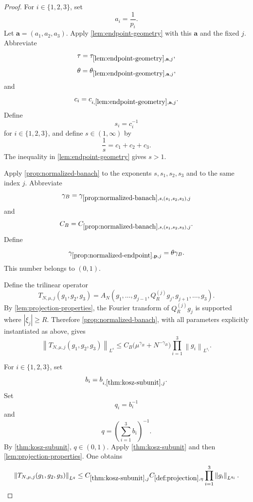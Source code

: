 \documentclass[11pt]{article}
\newcommand{\norm}[2]{\left\lVert #1\right\rVert_{#2}}
\newcommand{\Cst}[2]{C_{\ref{#1},#2}}
\newcommand{\Gam}[2]{\gamma_{\ref{#1},#2}}
\newcommand{\abs}[1]{\left|#1\right|}
\newcommand{\indices}{\{1,2,3\}}
\begin{document}
	\begin{proof}
		For \(i\in\indices\), set
		\[
		a_i=\frac1{p_i}.
		\]
		Let \(\mathbf a=(a_1,a_2,a_3)\).  Apply \cref{lem:endpoint-geometry} with this \(\mathbf a\) and the fixed \(j\).  Abbreviate
		\[
		\tau=\tau_{\ref{lem:endpoint-geometry},\mathbf a,j},
		\]
		\[
		\theta=\theta_{\ref{lem:endpoint-geometry},\mathbf a,j},
		\]
		and
		\[
		c_i=c_{i,\ref{lem:endpoint-geometry},\mathbf a,j}.
		\]
		Define
		\[
		s_i=c_i^{-1}
		\]
		for \(i\in\indices\), and define \(s\in(1,\infty)\) by
		\[
		\frac1s=c_1+c_2+c_3.
		\]
		The inequality in \cref{lem:endpoint-geometry} gives \(s>1\).
		
		Apply \cref{prop:normalized-banach} to the exponents \(s,s_1,s_2,s_3\) and to the same index \(j\).  Abbreviate
		\[
		\gamma_B=\Gam{prop:normalized-banach}{s,(s_1,s_2,s_3),j}
		\]
		and
		\[
		C_B=\Cst{prop:normalized-banach}{s,(s_1,s_2,s_3),j}.
		\]
		Define
		\[
		\Gam{prop:normalized-endpoint}{\mathbf p,j}=\theta\gamma_B.
		\]
		This number belongs to \((0,1)\).
		
		Define the trilinear operator
		\[
		T_{N,\mu,j}(g_1,g_2,g_3)
		=
		A_N(g_1,\ldots,g_{j-1},Q_R^{(j)}g_j,g_{j+1},\ldots,g_3).
		\]
		By \cref{lem:projection-properties}, the Fourier transform of \(Q_R^{(j)}g_j\) is supported where \(\abs{\xi_j}\geq R\).  Therefore \cref{prop:normalized-banach}, with all parameters explicitly instantiated as above, gives
		\[
		\norm{T_{N,\mu,j}(g_1,g_2,g_3)}{L^s}
		\leq
		C_B\bigl(\mu^{\gamma_B}+N^{-\gamma_B}\bigr)
		\prod_{i=1}^{3}\norm{g_i}{L^{s_i}}.
		\]
		
		For \(i\in\indices\), set
		\[
		b_i=b_{i,\ref{thm:kosz-subunit},j}.
		\]
		Set
		\[
		q_i=b_i^{-1}
		\]
		and
		\[
		q=\left(\sum_{i=1}^{3}b_i\right)^{-1}.
		\]
		By \cref{thm:kosz-subunit}, \(q\in(0,1)\).  Apply \cref{thm:kosz-subunit} and then \cref{lem:projection-properties}.  One obtains
		\[
		\norm{T_{N,\mu,j}(g_1,g_2,g_3)}{L^q}
		\leq
		\Cst{thm:kosz-subunit}{j}\Cst{def:projection}{\eta}
		\prod_{i=1}^{3}\norm{g_i}{L^{q_i}}.
		\]
		

\end{proof}
\end{document}

